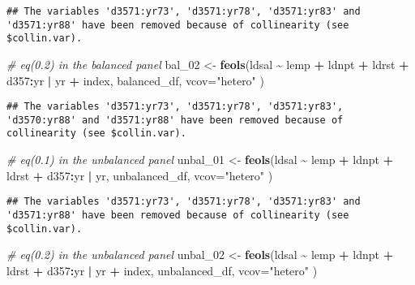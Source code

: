 \documentclass[
]{article}
\newenvironment{Shaded}{\begin{snugshade}}{\end{snugshade}}
\newcommand{\AttributeTok}[1]{\textcolor[rgb]{0.13,0.29,0.53}{#1}}
\newcommand{\CommentTok}[1]{\textcolor[rgb]{0.56,0.35,0.01}{\textit{#1}}}
\newcommand{\FunctionTok}[1]{\textcolor[rgb]{0.13,0.29,0.53}{\textbf{#1}}}
\newcommand{\NormalTok}[1]{#1}
\newcommand{\OtherTok}[1]{\textcolor[rgb]{0.56,0.35,0.01}{#1}}
\newcommand{\SpecialCharTok}[1]{\textcolor[rgb]{0.81,0.36,0.00}{\textbf{#1}}}
\newcommand{\StringTok}[1]{\textcolor[rgb]{0.31,0.60,0.02}{#1}}
\begin{document}
\begin{verbatim}
## The variables 'd3571:yr73', 'd3571:yr78', 'd3571:yr83' and 'd3571:yr88' have been removed because of collinearity (see $collin.var).
\end{verbatim}

\begin{Shaded}
\begin{Highlighting}[]
\CommentTok{\# eq(0.2) in the balanced panel}
\NormalTok{bal\_02 }\OtherTok{\textless{}{-}} \FunctionTok{feols}\NormalTok{(ldsal }\SpecialCharTok{\textasciitilde{}}\NormalTok{  lemp }\SpecialCharTok{+}\NormalTok{ ldnpt }\SpecialCharTok{+}\NormalTok{ ldrst }\SpecialCharTok{+}\NormalTok{ d357}\SpecialCharTok{:}\NormalTok{yr }\SpecialCharTok{|}\NormalTok{ yr }\SpecialCharTok{+}\NormalTok{ index, }
\NormalTok{               balanced\_df, }\AttributeTok{vcov=}\StringTok{"hetero"}
\NormalTok{)}
\end{Highlighting}
\end{Shaded}

\begin{verbatim}
## The variables 'd3571:yr73', 'd3571:yr78', 'd3571:yr83', 'd3570:yr88' and 'd3571:yr88' have been removed because of collinearity (see $collin.var).
\end{verbatim}

\begin{Shaded}
\begin{Highlighting}[]
\CommentTok{\# eq(0.1) in the unbalanced panel}
\NormalTok{unbal\_01 }\OtherTok{\textless{}{-}} \FunctionTok{feols}\NormalTok{(ldsal }\SpecialCharTok{\textasciitilde{}}\NormalTok{  lemp }\SpecialCharTok{+}\NormalTok{ ldnpt }\SpecialCharTok{+}\NormalTok{ ldrst }\SpecialCharTok{+}\NormalTok{ d357}\SpecialCharTok{:}\NormalTok{yr }\SpecialCharTok{|}\NormalTok{ yr, }
\NormalTok{               unbalanced\_df, }\AttributeTok{vcov=}\StringTok{"hetero"}
\NormalTok{)}
\end{Highlighting}
\end{Shaded}

\begin{verbatim}
## The variables 'd3571:yr73', 'd3571:yr78', 'd3571:yr83' and 'd3571:yr88' have been removed because of collinearity (see $collin.var).
\end{verbatim}

\begin{Shaded}
\begin{Highlighting}[]
\CommentTok{\# eq(0.2) in the unbalanced panel}
\NormalTok{unbal\_02 }\OtherTok{\textless{}{-}} \FunctionTok{feols}\NormalTok{(ldsal }\SpecialCharTok{\textasciitilde{}}\NormalTok{  lemp }\SpecialCharTok{+}\NormalTok{ ldnpt }\SpecialCharTok{+}\NormalTok{ ldrst }\SpecialCharTok{+}\NormalTok{ d357}\SpecialCharTok{:}\NormalTok{yr }\SpecialCharTok{|}\NormalTok{ yr }\SpecialCharTok{+}\NormalTok{ index, }
\NormalTok{               unbalanced\_df, }\AttributeTok{vcov=}\StringTok{"hetero"}
\NormalTok{)}
\end{Highlighting}
\end{Shaded}
\end{document}
